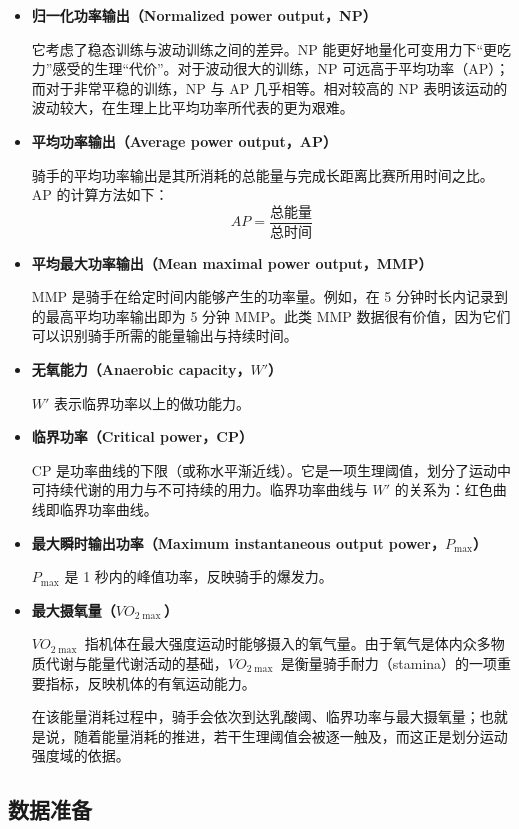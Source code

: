 \documentclass[11pt,a4paper]{ctexart}
\begin{document}
\begin{itemize}
\item \textbf{归一化功率输出（Normalized power output，NP）}

它考虑了稳态训练与波动训练之间的差异。NP 能更好地量化可变用力下“更吃力”感受的生理“代价”。对于波动很大的训练，NP 可远高于平均功率（AP）；而对于非常平稳的训练，NP 与 AP 几乎相等。相对较高的 NP 表明该运动的波动较大，在生理上比平均功率所代表的更为艰难。

\item \textbf{平均功率输出（Average power output，AP）}

骑手的平均功率输出是其所消耗的总能量与完成长距离比赛所用时间之比。AP 的计算方法如下：
\[
AP=\frac{\text{总能量}}{\text{总时间}}
\]

\item \textbf{平均最大功率输出（Mean maximal power output，MMP）}

MMP 是骑手在给定时间内能够产生的功率量。例如，在 5 分钟时长内记录到的最高平均功率输出即为 5 分钟 MMP。此类 MMP 数据很有价值，因为它们可以识别骑手所需的能量输出与持续时间。

\item \textbf{无氧能力（Anaerobic capacity，$W'$）}

$W'$ 表示临界功率以上的做功能力。

\item \textbf{临界功率（Critical power，CP）}

CP 是功率曲线的下限（或称水平渐近线）。它是一项生理阈值，划分了运动中可持续代谢的用力与不可持续的用力。临界功率曲线与 $W'$ 的关系为：红色曲线即临界功率曲线。

\item \textbf{最大瞬时输出功率（Maximum instantaneous output power，$P_{\max}$）}

$P_{\max}$ 是 1 秒内的峰值功率，反映骑手的爆发力。

\item \textbf{最大摄氧量（$VO_{2\max}$）}

$VO_{2\max}$ 指机体在最大强度运动时能够摄入的氧气量。由于氧气是体内众多物质代谢与能量代谢活动的基础，$VO_{2\max}$ 是衡量骑手耐力（stamina）的一项重要指标，反映机体的有氧运动能力。

在该能量消耗过程中，骑手会依次到达乳酸阈、临界功率与最大摄氧量；也就是说，随着能量消耗的推进，若干生理阈值会被逐一触及，而这正是划分运动强度域的依据。
\end{itemize}

\subsection{数据准备}
\end{document}

